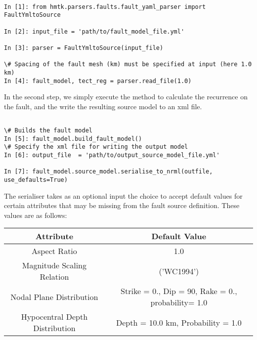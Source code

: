 \begin{Verbatim}[frame=single, commandchars=\\\{\}, fontsize=\scriptsize]

In [1]: from hmtk.parsers.faults.fault_yaml_parser import FaultYmltoSource

In [2]: input_file = 'path/to/fault_model_file.yml'

In [3]: parser = FaultYmltoSource(input_file)

\# Spacing of the fault mesh (km) must be specified at input (here 1.0 km) 
In [4]: fault_model, tect_reg = parser.read_file(1.0)

\end{Verbatim}

In the second step, we simply execute the method to calculate the recurrence on the fault, and the write the resulting source model to an xml file. 

\begin{Verbatim}[frame=single, commandchars=\\\{\}, fontsize=\scriptsize]

\# Builds the fault model
In [5]: fault_model.build_fault_model()
\# Specify the xml file for writing the output model
In [6]: output_file  = 'path/to/output_source_model_file.yml'

In [7]: fault_model.source_model.serialise_to_nrml(outfile, use_defaults=True)
\end{Verbatim}

The serialiser takes as an optional input the choice to accept default values for certain attributes that may be missing from the fault source definition. These values are as follows:

\begin{table}[h]
\begin{tabular}{|c|c|} \hline
\textbf{Attribute} & \textbf{Default Value} \\ \hline
Aspect Ratio & 1.0 \\
Magnitude Scaling Relation & \cite{wells1994} ('WC1994') \\
Nodal Plane Distribution & Strike = 0., Dip = 90, Rake = 0., probability= 1.0\\
Hypocentral Depth Distribution & Depth = 10.0 km, Probability = 1.0 \\ \hline

\end{tabular}

\end{table}

